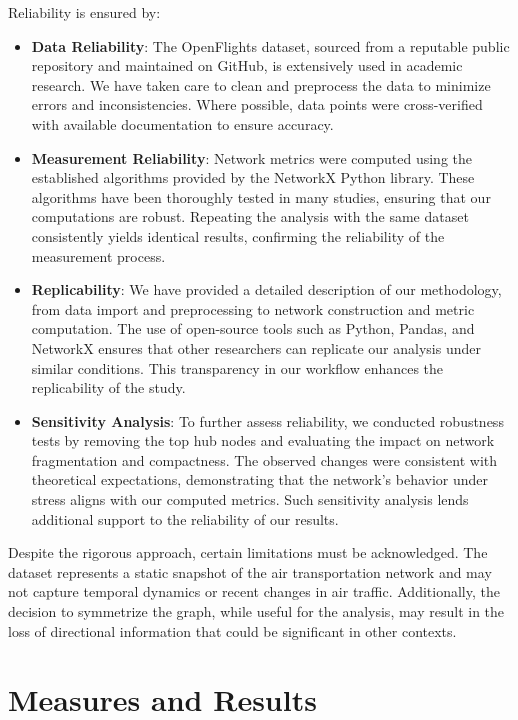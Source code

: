 \documentclass[12pt]{article}
\begin{document}
    Reliability is ensured by:
    \begin{itemize}
        \item \textbf{Data Reliability}: The OpenFlights dataset, sourced from a reputable public repository and maintained on GitHub, is extensively used in academic research. We have taken care to clean and preprocess the data to minimize errors and inconsistencies. Where possible, data points were cross-verified with available documentation to ensure accuracy.

        \item \textbf{Measurement Reliability}: Network metrics were computed using the established algorithms provided by the NetworkX Python library. These algorithms have been thoroughly tested in many studies, ensuring that our computations are robust. Repeating the analysis with the same dataset consistently yields identical results, confirming the reliability of the measurement process.

        \item \textbf{Replicability}: We have provided a detailed description of our methodology, from data import and preprocessing to network construction and metric computation. The use of open-source tools such as Python, Pandas, and NetworkX ensures that other researchers can replicate our analysis under similar conditions. This transparency in our workflow enhances the replicability of the study.

        \item \textbf{Sensitivity Analysis}: To further assess reliability, we conducted robustness tests by removing the top hub nodes and evaluating the impact on network fragmentation and compactness.
        The observed changes were consistent with theoretical expectations, demonstrating that the network's behavior under stress aligns with our computed metrics.
        Such sensitivity analysis lends additional support to the reliability of our results.

    \end{itemize}

    Despite the rigorous approach, certain limitations must be acknowledged. The dataset represents a static snapshot of the air transportation network and may not capture temporal dynamics or recent changes in air traffic. Additionally, the decision to symmetrize the graph, while useful for the analysis, may result in the loss of directional information that could be significant in other contexts.


    \section{Measures and Results}\label{sec:measures-and-results}
\end{document}
